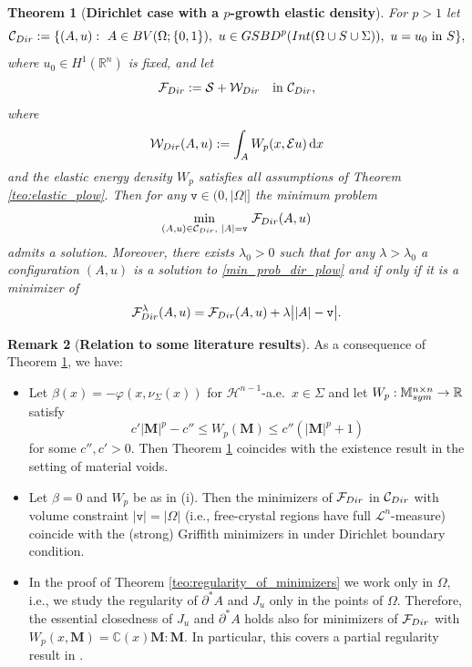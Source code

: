 \documentclass[reqno]{amsart}
\numberwithin{equation}{section}
\theoremstyle{plain}
\newtheorem{theorem}{Theorem}[section]
\theoremstyle{definition}
\newtheorem{remark}[theorem]{Remark}
\newcommand{\C}{\mathbb{C}}
\newcommand{\R}{\mathbb{R}}
\newcommand{\bM}{\mathbf{M}}
\newcommand{\fm}{\mathtt{v}}
\newcommand{\cH}{\mathcal{H}}
\newcommand{\cS}{\mathcal{S}}
\newcommand{\cF}{\mathcal{F}}
\newcommand{\cW}{\mathcal{W}}
\newcommand{\p}{\partial}
\renewcommand{\d}{\mathrm{d}}
\newcommand{\str}[1]{\mathcal{E}#1}
\newcommand{\mtwo}{\mathbb{M}^{n\times n}_{\rm sym}}
\newcommand{\admissible}{\mathcal{C}}
\newcommand{\substrate}{S}
\newcommand{\Ins}[1]{{\rm Int}{(#1\cup \substrate\cup \Sigma)}}
\begin{document}
\begin{theorem}[\textbf{Dirichlet case with a $p$-growth elastic density}]\label{teo:dirichlet_plow}
For $p>1$ let
$$
\admissible_{\rm Dir}:=\{(A,u):\,\,A\in BV(\Omega;\{0,1\}),\,\, u\in GSBD^p(\Ins{\Omega}),\,\,u=u_0\,\,\text{in $S$}\},
$$
where $u_0\in H^1(\R^n)$ is fixed, and let 
$$
\cF_{\rm Dir}:=\cS + \cW_{\rm Dir} \quad\text{in $\admissible_{\rm Dir}$},
$$
where
$$
\cW_{\rm Dir}(A,u):=\int_{A} W_p(x,\str{u})\,\d x 
$$
and the elastic energy density $W_p$ satisfies all assumptions of Theorem \ref{teo:elastic_plow}. Then for any $\fm\in (0,|\Omega|]$ the minimum problem 
\begin{equation}\label{min_prob_dir_plow}
\min\limits_{(A,u)\in\admissible_{\rm Dir},\,\,|A| = \fm} \,\cF_{\rm Dir}(A,u)
\end{equation}
admits a solution. Moreover, there exists $\lambda_0>0$ such that for any $\lambda>\lambda_0$ a configuration $(A,u)$ is a solution to \eqref{min_prob_dir_plow} and if only if it is a minimizer of
$$
\cF_{\rm Dir}^\lambda(A,u) = \cF_{\rm Dir}(A,u) + \lambda\big||A| - \fm\big|.
$$
\end{theorem}

\begin{remark}[\textbf{Relation to some literature results}]\label{rem:literature_models}
As a consequence of Theorem  \ref{teo:dirichlet_plow}, we have:
\begin{itemize}[left=12pt]
\item[(i)] Let $\beta(x) = -\varphi(x,\nu_\Sigma(x))$ for $\cH^{n-1}$-a.e.\ $x\in \Sigma$ and let $W_p:\mtwo\to\R$ satisfy
$$
c'|\bM|^p - c'' \le W_p(\bM) \le c'' (|\bM|^p + 1) 
$$
%
for some $c'',c'>0.$ Then Theorem \ref{teo:dirichlet_plow} coincides with the existence result \cite[Proposition 5.8]{CF:2020_arma} in the setting of material voids.

\item[(ii)] Let $\beta=0$ and $W_p$ be as in (i). Then the minimizers of $\cF_{\rm Dir}$ in $\admissible_{\rm Dir}$ with volume constraint $|\fm| = |\Omega|$ (i.e., free-crystal regions have full $\mathcal{L}^n$-measure) coincide with the (strong) Griffith minimizers in \cite{ChC:2019_arxiv} under Dirichlet boundary condition.

\item[(iii)] In the proof of Theorem \ref{teo:regularity_of_minimizers} we work only in $\Omega,$ i.e., we study the regularity of $\p^*A$ and $J_u$ only in the points of $\Omega.$ Therefore,  the essential closedness of $J_u$ and $\p^*A$ holds also for minimizers of $\cF_{\rm Dir}$ with
$W_p(x, \bM)=\C(x)\bM:\bM.$ In particular, this covers a partial regularity result in \cite{ChC:2019_arxiv}.
\end{itemize}
\end{remark}
\end{document}
